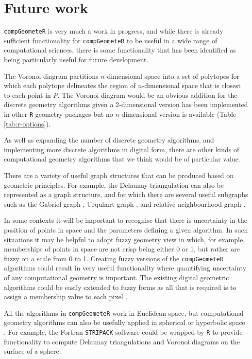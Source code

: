 \documentclass[12pt, a4paper]{article}
\begin{document}
\section{Future work}

\texttt{compGeometeR} is very much a work in progress, and while there is already sufficient functionality for \texttt{compGeometeR} to be useful in a wide range of computational sciences, there is some functionality that has been identified as being particularly useful for future development.

The Voronoi diagram \citep{voronoi-1908, okabe-2000} partitions $n$-dimensional space into a set of polytopes for which each polytope delineates the region of $n$-dimensional space that is closest to each point in $P$.  The Voronoi diagram would be an obvious addition for the discrete geometry algorithms given a 2-dimensional version has been implemented in other \texttt{R} geometry packages but no $n$-dimensional version is available (Table \ref{tab:r-options}).

As well as expanding the number of discrete geometry algorithms, and implementing more discrete algorithms in digital form, there are other kinds of computational geometry algorithms that we think would be of particular value.

There are a variety of useful graph structures that can be produced based on geometric principles.  For example, the Delaunay triangulation \citep{delaunay-1934} can also be represented as a graph structure, and for which there are several useful subgraphs such as the Gabriel graph \citep{gabriel-1969}, Urquhart graph \citep{urquhart-1980}, and relative neighbourhood graph \citep{toussaint-1980}.

In some contexts it will be important to recognise that there is uncertainty in the position of points in space and the parameters defining a given algorithm.  In such situations it may be helpful to adopt fuzzy geometry \citep{rosenfeld-1998} view in which, for example, memberships of points in space are not crisp being either 0 or 1, but rather are fuzzy on a scale from 0 to 1.  Creating fuzzy versions of the \texttt{compGeometeR} algorithms could result in very useful functionality where quantifying uncertainty of any computational geometry is important.  The existing digital geometric algorithms could be easily extended to fuzzy forms as all that is required is to assign a membership value to each pixel \citep{klette-2004}.

All the algorithms in \texttt{compGeometeR} work in Euclidean space, but computational geometry algorithms can also be usefully applied in spherical or hyperbolic space \citep{gowers-2003}.  For example, the Fortran \texttt{STRIPACK} software \citep{renka-1997} could be wrapped by \texttt{R} to provide functionality to compute Delaunay triangulations and Voronoi diagrams on the surface of a sphere.
\end{document}
